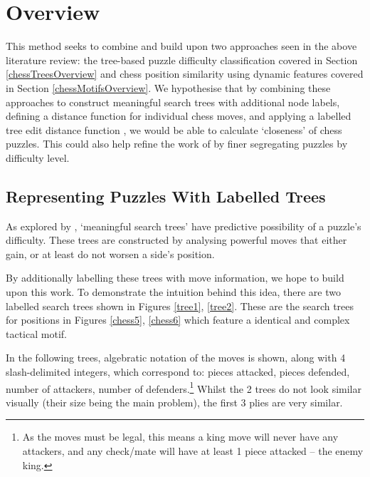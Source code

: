 \section{Overview}\label{treeS1}

This method seeks to combine and build upon two approaches seen in the above
literature review: the tree-based puzzle difficulty classification
\citep{chessTrees} covered in Section \ref{chessTreesOverview} and chess
position similarity using dynamic features \citep{chessMotifs} covered in
Section \ref{chessMotifsOverview}. We hypothesise that by combining these
approaches to construct meaningful search trees with additional node labels,
defining a distance function for individual chess moves, and applying a
labelled tree edit distance function \citep{editDistTrees}, we would be able to
calculate `closeness' of chess puzzles. This could also help refine the work of
\citet{chessTrees} by finer segregating puzzles by difficulty level.

\subsection{Representing Puzzles With Labelled Trees}\label{treeS11}

As explored by \citet{chessTrees}, `meaningful search trees' have predictive
possibility of a puzzle's difficulty. These trees are constructed by analysing
powerful moves that either gain, or at least do not worsen a side's position. 

By additionally labelling these trees with move information, we hope to build
upon this work. To demonstrate the intuition behind this idea, there are two
labelled search trees shown in Figures \ref{tree1}, \ref{tree2}. These are the
search trees for positions in Figures \ref{chess5}, \ref{chess6} which feature
a identical and complex tactical motif. 

In the following trees, algebratic notation of the moves is shown, along with 4
slash-delimited integers, which correspond to: pieces attacked, pieces
defended, number of attackers, number of defenders.\footnote{As the moves must
be legal, this means a king move will never have any attackers, and any
check/mate will have at least 1 piece attacked -- the enemy king.} Whilst the 2
trees do not look similar visually (their size being the main problem), the
first 3 plies are very similar. 

